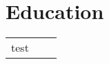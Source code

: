 \documentclass[11pt, letterpaper]{article}
\begin{document}
\section*{Education}

\begin{center}
\begin{tabularx}{\textwidth}{l X r}
test & 
\end{tabularx}
\end{center}
\end{document}
